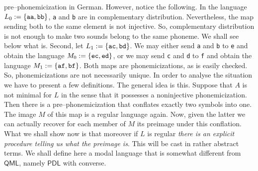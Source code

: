 pre--pho\-ne\-mi\-ci\-za\-tion in German. However, notice the following.
In the language $L_0 := \{\mbox{\tt aa}, \mbox{\tt bb}\}$, {\tt a}
and {\tt b} are in complementary distribution. Nevertheless, the map
sending both to the same element is not injective. So, complementary
distribution is not enough to make two sounds belong to the same
phoneme. We shall see below what is. Second, let $L_1 :=
\{\mbox{\tt ac}, \mbox{\tt bd}\}$. We may either send
{\tt a} and {\tt b} to {\tt e} and obtain the language
$M_0 := \{\mbox{\tt ec}, \mbox{\tt ed}\}$, or we may send
{\tt c} and {\tt d} to {\tt f} and obtain the language
$M_1 := \{\mbox{\tt af}, \mbox{\tt bf}\}$. Both maps are
phonemicizations, as is easily checked. So, phonemicizations are
not necessarily unique. In order to analyse the situation we have to
present a few definitions. The general idea is this. Suppose
that $A$ is not minimal for $L$ in the sense that it possesses
a noninjective phonemicization.  Then there is a pre--phonemicization
that conflates exactly two symbols into one. The image $M$ of this
map is a regular language again. Now, given the latter we can
actually recover for each member of $M$ its preimage under this
conflation. What we shall show now
is that moreover if $L$ is regular {\it there is an explicit procedure
telling us what the preimage is}. This will be cast in rather abstract
terms. We shall define here a modal language that is somewhat different
from $\mathsf{QML}$, namely $\mathsf{PDL}$ with converse. 

